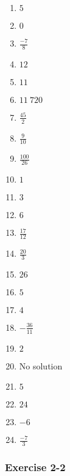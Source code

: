 {\begin{multicols}{3}
\begin{enumerate}[itemsep=1pt, label=\textbf{\arabic*}. ] 
\item $5$%
\item $0$%
\item $\frac{-7}{8}$ %
\item $12$%
\item $11$%
\item $11~ 720$%
\item$\frac{45}{2}$ %
\item$\frac{9}{10}$ %
\item $\frac{100}{26}$ %
\item $1$%
\item $3$%
\item $6$%
\item $\frac{17}{12}$%
\item $\frac{20}{3}$%
\item $26$%
\item $5$%
\item $4$%
\item $-\frac{36}{11}$%
\item $2$%
\item No solution%
\item $5$%
\item $24$%
\item $-6$%
\item $\frac{-7}{3}$%
  
\end{enumerate}



\subsubsection*{Exercise 2-2} %



\end{multicols}}
